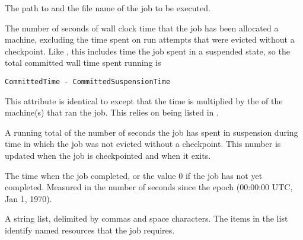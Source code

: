 \begin{description}
\item[\AdAttr{Cmd}:]  The path to and the file name of the job to be executed.

\label{CommittedTime}
\item[\AdAttr{CommittedTime}:] The number of seconds of wall clock time
that the job has been allocated a machine,
excluding the time spent on run attempts that
were evicted without a checkpoint.  
Like ,
this includes time the job spent in a suspended state,
so the total committed wall time spent running is 
\begin{verbatim}
CommittedTime - CommittedSuspensionTime
\end{verbatim}

\label{CommittedSlotTime}
\item[\AdAttr{CommittedSlotTime}:] This attribute is identical to
 except that the time is multiplied by the
 of the machine(s) that ran the job.  This relies
on  being listed in .

\item[\AdAttr{CommittedSuspensionTime}:]  A running total of the number of
seconds the job has spent in suspension during time in which the job was
not evicted without a checkpoint.  This number is updated when the job is
checkpointed and when it exits.

\item[\AdAttr{CompletionDate}:]  The time when the job completed,
or the value 0 if the job has not yet completed.
Measured in the
number of seconds since the epoch (00:00:00 UTC, Jan 1, 1970).

\item[\AdAttr{ConcurrencyLimits}:]  A string list,
delimited by commas and space characters.
The items in the list
identify named resources that the job requires.


\end{description}
